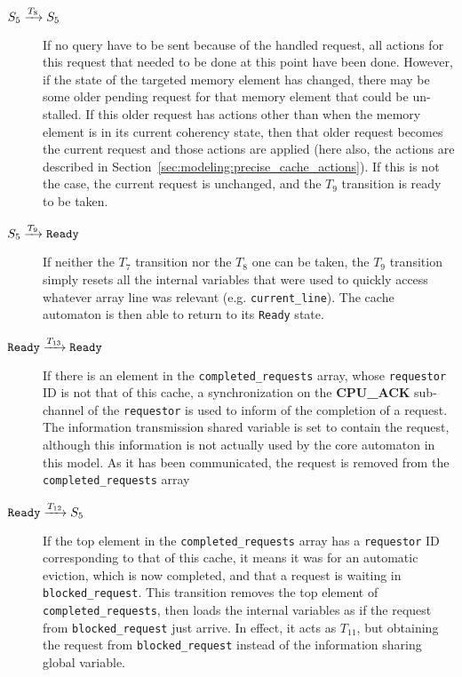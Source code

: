 \begin{description}
\item[$S_5 \xrightarrow[]{T_{8}} S_5$]
   If no query have to be sent because of the handled request, all actions for
   this request that needed to be done at this point have been done. However,
   if the state of the targeted memory element has changed, there may be some
   older pending request for that memory element that could be un-stalled. If
   this older request has actions other than \stallact{} when the memory
   element is in its current coherency state, then that older request becomes
   the current request and those actions are applied (here also, the actions
   are described in Section~\ref{sec:modeling:precise_cache_actions}). If this
   is not the case, the current request is unchanged, and the $T_9$ transition
   is ready to be taken.

\item[$S_5 \xrightarrow[]{T_{9}} \texttt{Ready}$]
   If neither the $T_7$ transition nor the $T_8$ one can be taken, the $T_9$
   transition simply resets all the internal variables that were used to quickly
   access whatever array line was relevant (e.g. \lstinline!current_line!).
   The cache automaton is then able to return to its \texttt{Ready} state.

\item[$\texttt{Ready} \xrightarrow[]{T_{13}} \texttt{Ready}$]
   If there is an element in the \lstinline!completed_requests! array, whose
   \texttt{requestor} ID is not that of this cache, a synchronization on the
   \textbf{CPU\_ACK} sub-channel of the \texttt{requestor} is used to inform of
   the completion of a request. The information transmission shared variable is
   set to contain the request, although this information is not actually used by
   the core automaton in this model. As it has been communicated, the
   request is removed from the \lstinline!completed_requests! array

\item[$\texttt{Ready} \xrightarrow[]{T_{12}} S_5$]
   If the top element in the \lstinline!completed_requests! array has
   a \texttt{requestor} ID corresponding to that of this cache, it means it was
   for an automatic eviction, which is now completed, and that
   a request is waiting in \lstinline!blocked_request!.
   This transition removes the top element of \lstinline!completed_requests!,
   then loads the internal variables as if the request from
   \lstinline!blocked_request! just arrive. In effect, it acts as $T_{11}$, but
   obtaining the request from \lstinline!blocked_request! instead of the
   information sharing global variable.
\end{description}


